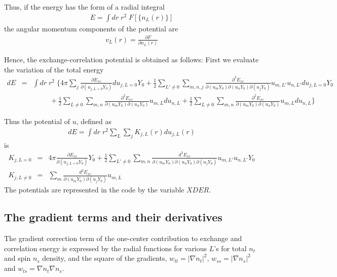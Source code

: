 \documentclass[11pt,a4paper]{report}
\begin{document}
Thus, if the energy has the form of a radial integral
\begin{eqnarray}
E=\int dr\;r^2\; F[\{n_L(r)\}]
\end{eqnarray}
the angular momentum components of the potential are
\begin{eqnarray}
v_L(r)=\frac{\partial F}{\partial n_L(r)}
\end{eqnarray}

Hence, the exchange-correlation potential is obtained as follows:
First we evaluate the variation of the total energy
\begin{eqnarray}
dE&=&\int dr\;r^2\; \biggl\lbrace
4\pi \sum_j\frac{\partial E_{xc}}{\partial (u_{j,L=0}Y_0)}
du_{j,L=0}Y_0
+
\frac{1}{2}
\sum_{L'\neq 0}\sum_{m,n,j} 
\frac{\partial^3E_{xc}}{\partial(u_mY_0)\partial(u_nY_0)\partial(u_jY_0)} u_{m,L'}u_{n,L'}du_{j,L=0}Y_0
\nonumber\\
&&\hspace{1cm}
+\frac{1}{2}
\sum_{L\neq 0} 
\sum_{m,n}
\frac{\partial^2E_{xc}}{\partial(u_mY_0)\partial(u_nY_0)} u_{m,L}du_{n,L}
+
\frac{1}{2}
\sum_{L\neq 0} 
\sum_{m,n}
\frac{\partial^2E_{xc}}{\partial(u_mY_0)\partial(u_nY_0)} u_{m,L}du_{n,L}
\biggr\rbrace
\end{eqnarray}


Thus the potential of $u$, defined as
\begin{eqnarray}
dE=\int dr\;r^2\sum_L\sum_j K_{j,L}(r)du_{j,L}(r)
\end{eqnarray}
is
\begin{eqnarray}
K_{j,L=0}&=&
4\pi\frac{\partial E_{xc}}{\partial (u_{j,L=0}Y_0)}Y_0
+
\frac{1}{2}
\sum_{L'\neq 0} 
\sum_{m,n}
\frac{d^3E_{xc}}{\partial(u_mY_0)\partial(u_nY_0)\partial(u_jY_0)} u_{m,L'}u_{n,L'}Y_0
\nonumber\\
K_{j,L\neq0}&=&
\sum_m
\frac{d^2E_{xc}}{\partial(u_mY_0)\partial(u_jY_0)} u_{m,L}
\end{eqnarray}
The potentials are represented in the code by the variable $XDER$.


\subsection{The gradient terms and their derivatives}
The gradient correction term of the one-center contribution to
exchange and correlation energy is expressed by the radial functions
for various $L$'s for total $n_t$ and spin $n_s$ density, and the
square of the gradients, $w_{tt}=|\nabla n_t|^2$, $w_{ss}=|\nabla
n_s|^2$ and $w_{ts}=\nabla n_t \nabla n_s$.
\end{document}
